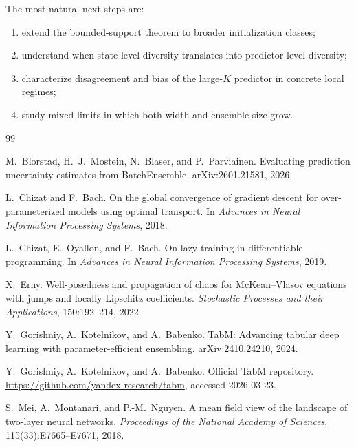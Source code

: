 \documentclass{article}
\theoremstyle{definition}
\begin{document}
The most natural next steps are:
\begin{enumerate}[leftmargin=2em]
  \item extend the bounded-support theorem to broader initialization classes;
  \item understand when state-level diversity translates into predictor-level diversity;
  \item characterize disagreement and bias of the large-$K$ predictor in concrete local regimes;
  \item study mixed limits in which both width and ensemble size grow.
\end{enumerate}
\begin{thebibliography}{99}

M.~Blorstad, H.~J.~Mostein, N.~Blaser, and P.~Parviainen.
\newblock Evaluating prediction uncertainty estimates from BatchEnsemble.
\newblock arXiv:2601.21581, 2026.

L.~Chizat and F.~Bach.
\newblock On the global convergence of gradient descent for over-parameterized models using optimal transport.
\newblock In \emph{Advances in Neural Information Processing Systems}, 2018.

L.~Chizat, E.~Oyallon, and F.~Bach.
\newblock On lazy training in differentiable programming.
\newblock In \emph{Advances in Neural Information Processing Systems}, 2019.

X.~Erny.
\newblock Well-posedness and propagation of chaos for McKean--Vlasov equations with jumps and locally Lipschitz coefficients.
\newblock \emph{Stochastic Processes and their Applications}, 150:192--214, 2022.

Y.~Gorishniy, A.~Kotelnikov, and A.~Babenko.
\newblock TabM: Advancing tabular deep learning with parameter-efficient ensembling.
\newblock arXiv:2410.24210, 2024.

Y.~Gorishniy, A.~Kotelnikov, and A.~Babenko.
\newblock Official TabM repository.
\newblock \url{https://github.com/yandex-research/tabm}, accessed 2026-03-23.

S.~Mei, A.~Montanari, and P.-M.~Nguyen.
\newblock A mean field view of the landscape of two-layer neural networks.
\newblock \emph{Proceedings of the National Academy of Sciences}, 115(33):E7665--E7671, 2018.


\end{thebibliography}
\end{document}
